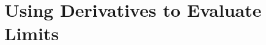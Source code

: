 \section{Using Derivatives to Evaluate Limits} \label{S:2.8.Implicit}



\newpage



\newpage



\newpage



\newpage